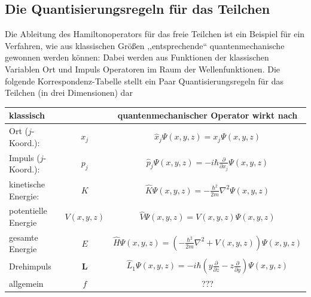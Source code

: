 \subsection{Die Quantisierungsregeln für das Teilchen}
Die Ableitung des Hamiltonoperators für das freie Teilchen ist ein Beispiel für ein Verfahren, wie
aus klassischen Größen ,,entsprechende`` quantenmechanische gewonnen werden können: Dabei werden aus Funktionen der klassischen Variablen Ort und Impuls Operatoren im Raum der Wellenfunktionen. Die folgende Korrespondenz-Tabelle stellt ein Paar Quantisierungsregeln für das Teilchen (in drei Dimensionen) dar
\begin{center}
\begin{tabular}{lcc}    \toprule
{\bf klassisch} & & {\bf quantenmechanischer Operator wirkt nach}  \\\midrule
Ort ($j$-Koord.): &$x_j$ & $\widehat{x}_j \Psi(x,y,z) = x_j \Psi(x,y,z)$  \\ 
\rowcolor{isabelline} Impuls ($j$-Koord.):& $p_j$ & $\widehat{p}_j \Psi(x,y,z) = -i \hbar \frac{\partial}{\partial x_j}\Psi(x,y,z)$  \\ 
kinetische Energie: & $K$ & $\widehat{K}\Psi(x,y,z) = -\frac{\hbar^2}{2m} \nabla^2 \Psi(x,y,z)$ \\
\rowcolor{isabelline} potentielle Energie & $V(x,y,z)$ & $\widehat{V} \Psi(x,y,z) = V(x,y,z)\Psi(x,y,z)$ \\
gesamte Energie & $E$ & $\widehat{H}\Psi(x,y,z) = \left(-\frac{\hbar^2}{2m} \nabla^2+ V(x,y,z)\right)\Psi(x,y,z)$ \\
\rowcolor{isabelline} Drehimpuls & $\mathbf{L}$ & $\widehat{L}_1\Psi(x,y,z) = -i \hbar (y \frac{\partial}{\partial z} - z \frac{\partial}{\partial y})\Psi(x,y,z)$  \\
allgemein & $f$ & ??? \\
\bottomrule
\end{tabular}
\end{center}


